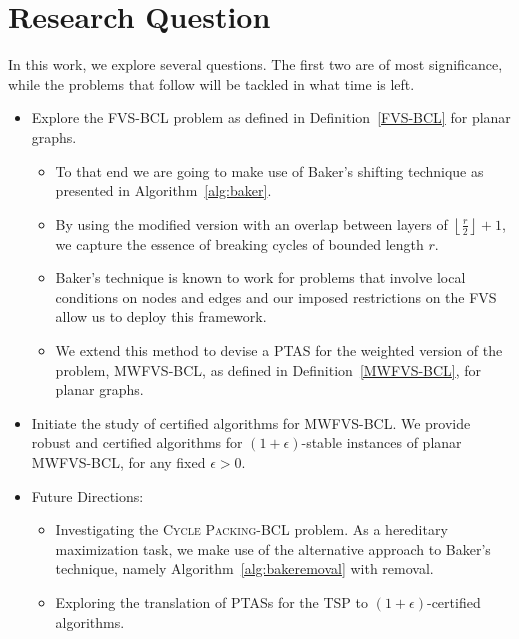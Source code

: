 \section{Research Question}

In this work, we explore several questions. The first two are of most significance, while the problems that follow 
will be tackled in what time is left.

\begin{itemize}[left=0pt, labelsep=5pt]
    \item Explore the \textsc{FVS-BCL} problem as defined in Definition~\ref{FVS-BCL} for planar graphs.
    \begin{itemize}[left=2pt, labelsep=5pt]
        \item To that end we are going to make use of Baker's shifting technique \cite{Baker} as presented in Algorithm~\ref{alg:baker}.
        \item By using the modified version with an overlap between layers of $\left\lfloor \frac{r}{2} \right\rfloor + 1$,
        we capture the essence of breaking cycles of bounded length $r$.
        \item Baker's technique is known to work for problems that involve local conditions on nodes and edges and our imposed restrictions on the \textsc{FVS}
        allow us to deploy this framework.
        \item We extend this method to devise a PTAS for the weighted version of the problem, \textsc{MWFVS-BCL}, as defined in Definition~\ref{MWFVS-BCL},
        for planar graphs.
    \end{itemize}
    \item Initiate the study of certified algorithms for \textsc{MWFVS-BCL}.
    We provide robust and certified algorithms for $(1 + \epsilon)$-stable instances of planar \textsc{MWFVS-BCL}, for any
    fixed $\epsilon > 0$. 
    \item Future Directions:
    \begin{itemize}[left=2pt, labelsep=5pt]
        \item Investigating the \textsc{Cycle Packing-BCL} problem. As a hereditary maximization task, we make use of the
        alternative approach to Baker's technique, namely Algorithm~\ref{alg:bakeremoval} with removal.
        \item Exploring the translation of PTASs for the \textsc{TSP} to $(1 + \epsilon)$-certified algorithms.
    \end{itemize}
\end{itemize}